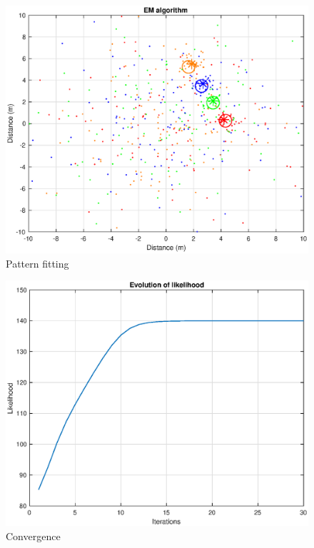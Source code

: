 \begin{figure}[H]
\centering
\includegraphics[scale=0.55]{fig/em_blobs.eps}
\caption[Pattern fitting with EM algorithm]{Pattern fitting}
\label{fig:em_blobs}
\end{figure}

\begin{figure}[H]
\centering
\includegraphics[scale=0.55]{fig/em_iterations.eps}
\caption[Convergence of pattern fitting]{Convergence }
\label{fig:convergence}
\end{figure}